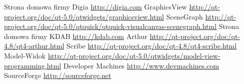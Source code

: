 \documentclass[11pt,twoside,a4paper,final]{llncs}
\begin{document}
\begin{thebibliography}{}
Strona domowa firmy Digia \url{http://digia.com}
GraphicsView \url{http://qt-project.org/doc/qt-5.0/qtwidgets/graphicsview.html}
SceneGraph \url{http://qt-project.org/doc/qt-5.0/qtquick/qtquick-visualcanvas-scenegraph.html}
Strona domowa firmy KDAB \url{http://kdab.com}
Arthur \url{http://qt-project.org/doc/qt-4.8/qt4-arthur.html}
Scribe \url{http://qt-project.org/doc/qt-4.8/qt4-scribe.html}
Model-Widok \url{http://qt-project.org/doc/qt-5.0/qtwidgets/model-view-programming.html}
Developer Machines \url{http://www.devmachines.com}
SourceForge \url{http://sourceforge.net}

\end{thebibliography}
\end{document}
